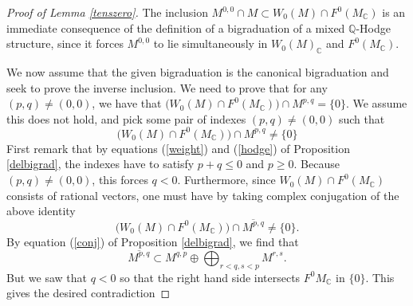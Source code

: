 \documentclass[10pt]{article}
\numberwithin{equation}{subsection}
\theoremstyle{plain}
\theoremstyle{definition}
\theoremstyle{remark}
\newcommand{\Q}{\mathbb Q}
\newcommand{\C}{\mathbb C}
\begin{document}
\begin{proof}[Proof of Lemma \ref{tenszero}]
The inclusion $M^{0,0} \cap M \subset W_0(M) \cap F^0(M_\C)$ is an immediate consequence of the definition of a bigraduation of a mixed $\Q$-Hodge structure, since it forces $M^{0,0}$ to lie simultaneously in $W_0(M)_\C$ and $F^0(M_\C)$.

We now assume that the given bigraduation is the canonical bigraduation and seek to prove the inverse inclusion. We need to prove that for any $(p,q) \neq (0,0)$, we have that $\Big( W_0(M) \cap F^0(M_\C)\Big) \cap M^{p,q}  = \{0\}$. We assume this does not hold, and pick some pair of indexes $(p,q) \neq (0,0)$ such that 
\[
\Big( W_0(M) \cap F^0(M_\C)\Big) \cap M^{p,q}  \neq \{0\}
\]
First remark that by equations (\ref{weight}) and (\ref{hodge}) of Proposition \ref{delbigrad}, the indexes have to satisfy $p+q \leqslant 0$ and $p \geqslant 0$. Because $(p,q) \neq (0,0)$, this forces $q < 0$. Furthermore, since $W_0(M) \cap F^0(M_\C)$ consists of rational vectors, one must have by taking complex conjugation of the above identity
\[
\Big( W_0(M) \cap F^0(M_\C)\Big) \cap \overline{M^{p,q}}  \neq \{0\}.
\]
By equation (\ref{conj}) of Proposition \ref{delbigrad}, we find that
\[
\overline{M^{p,q}} \subset M^{q,p} \oplus \bigoplus_{r<q, s<p}M^{r,s}.
\]
But we saw that $q < 0$ so that the right hand side intersects $F^0 M_\C$ in $\{0\}$. This gives the desired contradiction
\end{proof}
\end{document}
